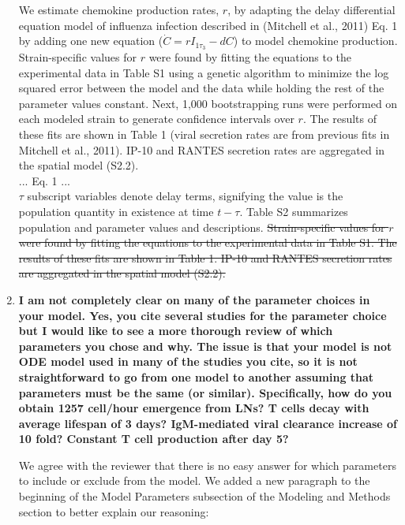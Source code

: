\documentclass[10pt]{article}
\newcommand{\removed}[1]{{\color{dkred}\sout{#1}}}
\newcommand{\new}[1]{{\color{dkgreen}#1}}
\newenvironment{response}{\fontfamily{cms}\selectfont\small}{\par}
\begin{document}
\begin{enumerate}
\begin{response}
\begin{displayquote}
We estimate chemokine production rates, $r$, by adapting the delay differential equation model of influenza infection described in (Mitchell et al., 2011) Eq. 1 by adding one new equation ($\dot{C}=r I_{1 \tau_3}-dC$) to model chemokine production.   \new{Strain-specific values for $r$ were found by fitting the equations to the experimental data in Table S1 using a genetic algorithm to minimize the log squared error between the model and the data while holding the rest of the parameter values constant.  Next, 1,000 bootstrapping runs were performed on each modeled strain to generate confidence intervals over $r$.}  The results of these fits are shown in Table 1 \new{(viral secretion rates are from previous fits in Mitchell et al., 2011)}.  IP-10 and RANTES secretion rates are aggregated in the spatial model (S2.2). \\

... Eq. 1 ... \\

$\tau$ subscript variables denote delay terms, signifying the value is the population quantity in existence at time $t - \tau$.  Table S2 summarizes population and parameter values and descriptions.  \removed{Strain-specific values for $r$ were found by fitting the equations to the experimental data in Table S1.  The results of these fits are shown in Table 1.  IP-10 and RANTES secretion rates are aggregated in the spatial model (S2.2).}
\end{displayquote}
\end{response}

\item \textbf{I am not completely clear on many of the parameter choices in your model. Yes, you cite several studies for the parameter choice but I would like to see a more thorough review of which parameters you chose and why. The issue is that your model is not ODE model used in many of the studies you cite, so it is not straightforward to go from one model to another assuming that parameters must be the same (or similar). Specifically, how do you obtain 1257 cell/hour emergence from LNs? T cells decay with average lifespan of 3 days? IgM-mediated viral clearance increase of 10 fold? Constant T cell production after day 5?}

\begin{response}
We agree with the reviewer that there is no easy answer for which parameters to include or exclude from the model.  We added a new paragraph to the beginning of the Model Parameters subsection of the Modeling and Methods section to better explain our reasoning:


\end{response}
\end{enumerate}
\end{document}
